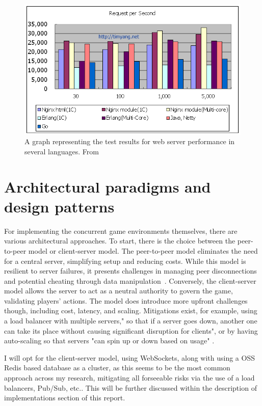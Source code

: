 \documentclass[]{final}
\begin{document}
\begin{figure}[ht!]
  \centering
  \includegraphics[width=\linewidth]{c_erlang_java_go}
  \vspace*{-0.5cm}
  \caption{A graph representing the test results for web server performance in several languages. From \cite{yang_c_nodate}}
  \label{fig: 1}
\end{figure}

\section{Architectural paradigms and design patterns}

For implementing the concurrent game environments themselves, there are various architectural approaches.
To start, there is the choice between the peer-to-peer model or client-server model.
The peer-to-peer model eliminates the need for a central server, simplifying setup and
reducing costs. While this model is resilient to server failures, it presents challenges
in managing peer disconnections and potential cheating through data manipulation~\cite{franchetti_coping_2020}.
Conversely, the client-server model allows the server to act as a neutral authority to govern the game,
validating players' actions. The model does introduce more upfront challenges though, including cost,
latency, and scaling. Mitigations exist, for example, using a load balancer with multiple servers," so
that if a server goes down, another one can take its place without causing significant
disruption for clients", or by having auto-scaling so that servers "can spin up or down
based on usage" \cite{pandey_peer--peer_2022}.

I will opt for the client-server model, using WebSockets, along with using a OSS Redis based database as a cluster,
as this seems to be the most common approach
across my research, mitigating all forseeable risks via the use of a load balancers,
Pub/Sub, etc.. This will be further discussed within the description of implementations section of this report.
\end{document}
